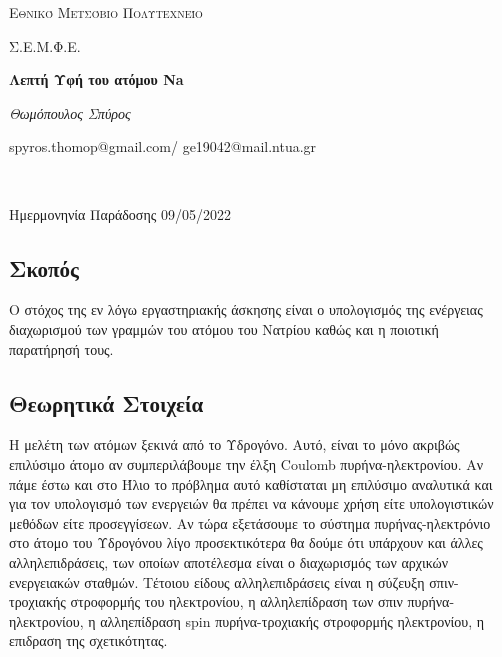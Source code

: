 \documentclass[a4paper]{article}
\begin{document}
\begin{titlepage}			%
	\centering
	{\scshape\LARGE Εθνικό Μετσόβιο Πολυτεχνείο\par}
	{\scshape \LARGE Σ.Ε.Μ.Φ.Ε.\par}
	\vspace{1cm}
	{\huge\bfseries Λεπτή Υφή του ατόμου Na \par}
	\vspace{1cm}
	{\Large\itshape Θωμόπουλος Σπύρος\par}		%
	
	{\large spyros.thomop@gmail.com/ ge19042@mail.ntua.gr\par \hfill \\}%
	\vspace{1cm}
	{\large Ημερμονηνία Παράδοσης 09/05/2022\par}
\end{titlepage}

\subsection*{Σκοπός}
	Ο στόχος της εν λόγω εργαστηριακής άσκησης είναι ο υπολογισμός της ενέργειας διαχωρισμού των γραμμών του ατόμου του Νατρίου καθώς και η ποιοτική παρατήρησή τους.
	
	\subsection*{Θεωρητικά Στοιχεία}
		Η μελέτη των ατόμων ξεκινά από το Υδρογόνο. Αυτό, είναι το μόνο ακριβώς επιλύσιμο άτομο αν συμπεριλάβουμε την έλξη Coulomb πυρήνα-ηλεκτρονίου. Αν πάμε έστω και στο Ήλιο το πρόβλημα αυτό καθίσταται μη επιλύσιμο αναλυτικά και για τον υπολογισμό των ενεργειών θα πρέπει να κάνουμε χρήση είτε υπολογιστικών μεθόδων είτε προσεγγίσεων. 	
		Αν τώρα εξετάσουμε το σύστημα πυρήνας-ηλεκτρόνιο στο άτομο του Υδρογόνου λίγο προσεκτικότερα θα δούμε ότι υπάρχουν και άλλες αλληλεπιδράσεις, των οποίων αποτέλεσμα είναι ο διαχωρισμός των αρχικών ενεργειακών σταθμών. Τέτοιου είδους αλληλεπιδράσεις είναι η σύζευξη σπιν-τροχιακής στροφορμής του ηλεκτρονίου, η αλληλεπίδραση των σπιν πυρήνα-ηλεκτρονίου, η αλληεπίδραση spin πυρήνα-τροχιακής στροφορμής ηλεκτρονίου, η επιδραση της σχετικότητας. 
		
\end{document}
